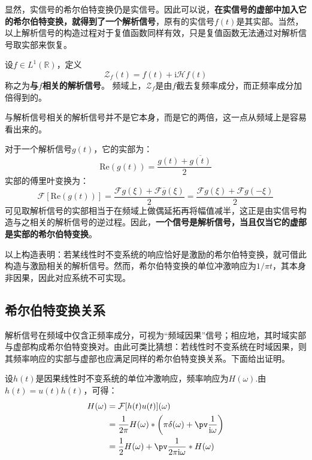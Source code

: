 显然，实信号的希尔伯特变换仍是实信号。因此可以说，\textbf{在实信号的虚部中加入它的希尔伯特变换，就得到了一个解析信号}，原有的实信号$f(t)$是其实部。当然，以上解析信号的构造过程对于复值函数同样有效，只是复值函数无法通过对解析信号取实部来恢复。

\begin{definition}
    设$f\in L^1(\mathbb{R})$，定义
    $$\mathcal{Z}_f(t)=f(t)+\mathrm{i}\mathcal{H} f(t)$$
    称之为\textbf{与}$f$\textbf{相关的解析信号}。
    频域上，$\mathcal{Z} _f$是由$f$截去复频率成分，而正频率成分加倍得到的。
\end{definition}

与解析信号相关的解析信号并不是它本身，而是它的两倍，这一点从频域上是容易看出来的。

对于一个解析信号$g(t)$，它的实部为：
$$\text{Re}(g(t))=\frac{g(t)+\overline{g(t)}}{2}$$
实部的傅里叶变换为：
$$\mathcal{F}[\text{Re}(g(t))]=\frac{\mathcal{F}g(\xi)+\mathcal{F}\overline{g}(\xi)}{2}=\frac{\mathcal{F}g(\xi)+\mathcal{F}g(-\xi)}{2}$$
可见取解析信号的实部相当于在频域上做偶延拓再将幅值减半，这正是由实信号构造与之相关的解析信号的逆过程。因此，\textbf{一个信号是解析信号，当且仅当它的虚部是实部的希尔伯特变换}。

以上构造表明：若某线性时不变系统的响应恰好是激励的希尔伯特变换，就可借此构造与激励相关的解析信号。然而，希尔伯特变换的单位冲激响应为$1/\pi t$，其本身非因果，因此对应系统不可实现。

\subsection{希尔伯特变换关系}\label{sub:hilbert_relation}

解析信号在频域中仅含正频率成分，可视为“频域因果”信号；相应地，其时域实部与虚部构成希尔伯特变换对。由此可类比猜想：若线性时不变系统在时域因果，则其频率响应的实部与虚部也应满足同样的希尔伯特变换关系。下面给出证明。

设$h(t)$是因果线性时不变系统的单位冲激响应，频率响应为$H(\omega)$.由$h(t)=u(t)h(t)$，可得：
\begin{align*}
    H(\omega)&=\mathcal{F} [h(t)u(t)](\omega)\\
    &=\frac{1}{2\pi}H(\omega)*\left(\pi\delta(\omega)+\pv\frac{1}{\mathrm{i}\omega}\right)\\
    &=\frac{1}{2}H(\omega)+\pv\frac{1}{2\pi \mathrm{i}\omega}*H(\omega)
\end{align*}

